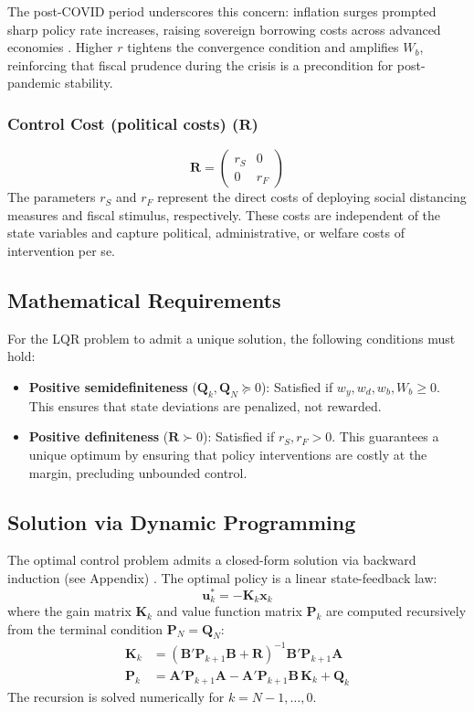 The post-COVID period underscores this concern: inflation surges 
prompted sharp policy rate increases, raising sovereign borrowing 
costs across advanced economies \citep{JORDA2023104474}. Higher $r$ 
tightens the convergence condition and amplifies $W_b$, reinforcing 
that fiscal prudence during the crisis is a precondition for 
post-pandemic stability.

\subsubsection{Control Cost (political costs) ($\bm{R}$)}
\begin{equation}
\bm{R} = 
\begin{pmatrix} 
r_S & 0 \\ 
0 & r_F 
\end{pmatrix}
\end{equation}
The parameters $r_S$ and $r_F$ represent the direct costs of 
deploying social distancing measures and fiscal stimulus, 
respectively. These costs are independent of the state variables and 
capture political, administrative, or welfare costs of intervention 
per se.

\subsection{Mathematical Requirements}
For the LQR problem to admit a unique solution, the following 
conditions must hold:
\begin{itemize}
    \item \textbf{Positive semidefiniteness} ($\bm{Q}_k, \bm{Q}_N 
    \succeq 0$): Satisfied if $w_y, w_d, w_b, W_b \geq 0$. 
    This ensures that state deviations are penalized, not rewarded.
    \item \textbf{Positive definiteness} ($\bm{R} \succ 0$): Satisfied 
    if $r_S, r_F > 0$. This guarantees a unique optimum by ensuring 
    that policy interventions are costly at the margin, precluding 
    unbounded control.
\end{itemize}


\subsection{Solution via Dynamic Programming}
The optimal control problem admits a closed-form solution via 
backward induction (see Appendix) \citep[Chapter 3.1]{bertsekas2017dynamic}. 
The optimal policy is a linear state-feedback law:
\begin{equation}
    \bm{u}_k^* = -\bm{K}_k \bm{x}_k
\end{equation}
where the gain matrix $\bm{K}_k$ and value function matrix 
$\bm{P}_k$ are computed recursively from the terminal condition 
$\bm{P}_N = \bm{Q}_N$:
\begin{align}
    \bm{K}_k &= \left( \bm{B}' \bm{P}_{k+1} \bm{B} + \bm{R} \right)^{-1} 
    \bm{B}' \bm{P}_{k+1} \bm{A} \\[1ex]
    \bm{P}_k &= \bm{A}' \bm{P}_{k+1} \bm{A} - \bm{A}' \bm{P}_{k+1} \bm{B} 
    \, \bm{K}_k + \bm{Q}_k
\end{align}
The recursion is solved numerically for $k = N-1, \ldots, 0$.


